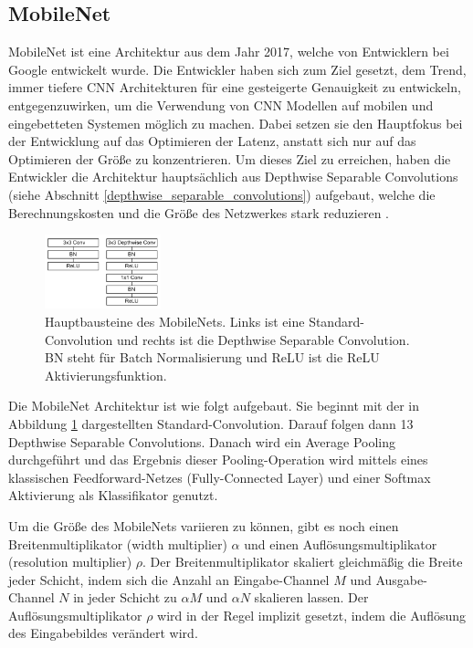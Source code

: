 \subsection{MobileNet}
\label{mobilenet}
MobileNet \cite{howard_mobilenets_2017} ist eine Architektur aus dem Jahr 2017, welche von Entwicklern bei Google entwickelt wurde. Die Entwickler haben sich zum Ziel gesetzt, dem Trend, immer tiefere CNN Architekturen für eine gesteigerte Genauigkeit zu entwickeln, entgegenzuwirken, um die Verwendung von CNN Modellen auf mobilen und eingebetteten Systemen möglich zu machen. Dabei setzen sie den Hauptfokus bei der Entwicklung auf das Optimieren der Latenz, anstatt sich nur auf das Optimieren der Größe zu konzentrieren. Um dieses Ziel zu erreichen, haben die Entwickler die Architektur hauptsächlich aus Depthwise Separable Convolutions (siehe Abschnitt \ref{depthwise_separable_convolutions}) aufgebaut, welche die Berechnungskosten und die Größe des Netzwerkes stark reduzieren \cite{howard_mobilenets_2017}.

\begin{figure}[htbp]
\centerline{\includegraphics[width=0.3\textwidth]{content/images/mobilenet_blocks.png}}
\caption{Hauptbausteine des MobileNets. Links ist eine Standard-Convolution und rechts ist die Depthwise Separable Convolution. BN steht für Batch Normalisierung \cite{ioffe_batch_2015} und ReLU ist die ReLU Aktivierungsfunktion. \cite{howard_mobilenets_2017}}
\label{f2.7}
\end{figure}

Die MobileNet Architektur ist wie folgt aufgebaut. Sie beginnt mit der in Abbildung \ref{f2.7} dargestellten Standard-Convolution. Darauf folgen dann 13 Depthwise Separable Convolutions. Danach wird ein Average Pooling durchgeführt und das Ergebnis dieser Pooling-Operation wird mittels eines klassischen Feedforward-Netzes (Fully-Connected Layer) und einer Softmax Aktivierung als Klassifikator genutzt.

Um die Größe des MobileNets variieren zu können, gibt es noch einen Breitenmultiplikator (width multiplier) $\alpha$ und einen Auflösungsmultiplikator (resolution multiplier) $\rho$. Der Breitenmultiplikator skaliert gleichmäßig die Breite jeder Schicht, indem sich die Anzahl an Eingabe-Channel $M$ und Ausgabe-Channel $N$ in jeder Schicht zu $\alpha M$ und $\alpha N$ skalieren lassen.
Der Auflösungsmultiplikator $\rho$ wird in der Regel implizit gesetzt, indem die Auflösung des Eingabebildes verändert wird.


